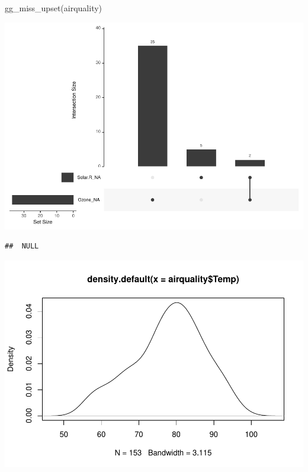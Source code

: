 \documentclass[
  12pt,
]{article}
\newenvironment{Shaded}{\begin{snugshade}}{\end{snugshade}}
\newcommand{\DocumentationTok}[1]{\textcolor[rgb]{0.56,0.35,0.01}{\textbf{\textit{#1}}}}
\newcommand{\FunctionTok}[1]{\textcolor[rgb]{0.00,0.00,0.00}{#1}}
\newcommand{\NormalTok}[1]{#1}
\newcommand{\OtherTok}[1]{\textcolor[rgb]{0.56,0.35,0.01}{#1}}
\newcommand{\SpecialCharTok}[1]{\textcolor[rgb]{0.00,0.00,0.00}{#1}}
\begin{document}
\begin{Shaded}
\begin{Highlighting}[]
\FunctionTok{gg\_miss\_upset}\NormalTok{(airquality)}
\end{Highlighting}
\end{Shaded}

\includegraphics{articleCustomerDropoutMembership_files/figure-latex/Stats1-3.pdf}

\begin{Shaded}
\end{Shaded}

\begin{verbatim}
##  NULL
\end{verbatim}

\begin{Shaded}
\end{Shaded}

\includegraphics{articleCustomerDropoutMembership_files/figure-latex/Stats1-4.pdf}
\end{document}
